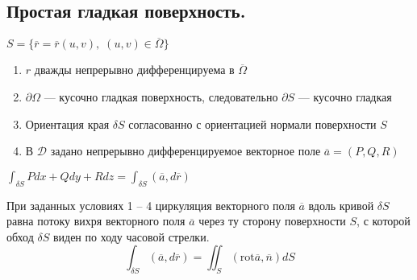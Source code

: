\documentclass{letnab}
\begin{document}
\subsection{Простая гладкая поверхность.}
$ S = \{ \overline{r} = \overline{r} (u,v),\; (u,v) \in \overline{\Omega} \} $
\begin{enumerate}
	\item  $ r $ дважды непрерывно дифференцируема в $ \overline{\Omega} $
	\item $ \partial \Omega $ --- кусочно гладкая поверхность, следовательно $ \partial S $ --- кусочно гладкая
	\item Ориентация края $ \delta S $ согласованно с ориентацией нормали поверхности $ S $
	\item В $ \mathcal{D} $ задано непрерывно дифференцируемое векторное поле $ \overline{a} = (P,Q,R) $ 
\end{enumerate}
$ \int_{\delta S} Pdx + Qdy + Rdz = \int_{\delta S} (\overline{a}, d\overline{r})$
\setcounter{theorem}{0}
\begin{theorem}
	При заданных условиях 1 -- 4 циркуляция векторного поля $ \overline{a} $ вдоль кривой $\delta S $ равна потоку вихря векторного поля $ \overline{a} $ через ту сторону поверхности $ S $, с которой обход $ \delta S $ виден по ходу часовой стрелки.
	$$ \int_{\delta S} (\overline{a},d\overline{r}) = \iint_{S} (\mathrm{rot} \overline{a}, \overline{n})dS$$
\end{theorem}
\end{document}
